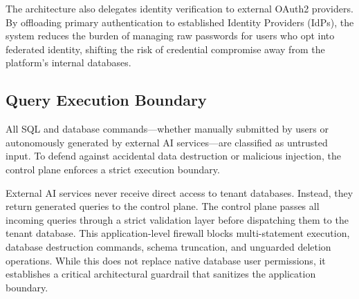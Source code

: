 The architecture also delegates identity verification to external OAuth2 providers. By offloading primary authentication to established Identity Providers (IdPs), the system reduces the burden of managing raw passwords for users who opt into federated identity, shifting the risk of credential compromise away from the platform's internal databases.

\subsection{Query Execution Boundary}

All SQL and database commands—whether manually submitted by users or autonomously generated by external AI services—are classified as untrusted input. To defend against accidental data destruction or malicious injection, the control plane enforces a strict execution boundary.

External AI services never receive direct access to tenant databases. Instead, they return generated queries to the control plane. The control plane passes all incoming queries through a strict validation layer before dispatching them to the tenant database. This application-level firewall blocks multi-statement execution, database destruction commands, schema truncation, and unguarded deletion operations. While this does not replace native database user permissions, it establishes a critical architectural guardrail that sanitizes the application boundary.
